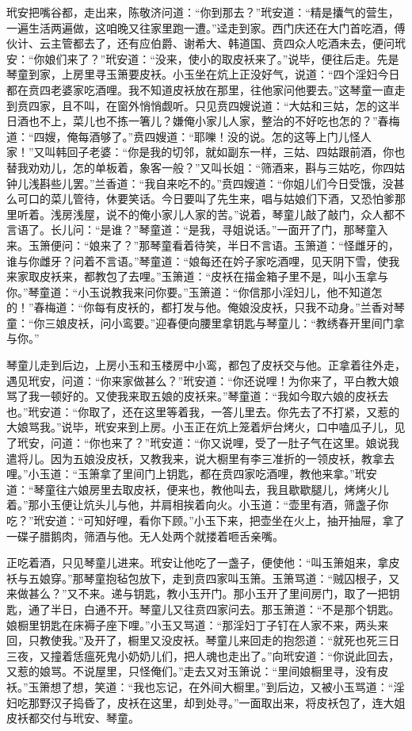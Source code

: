 玳安把嘴谷都，走出来，陈敬济问道：“你到那去？”玳安道：“精是攮气的营生，一遍生活两遍做，这咱晚又往家里跑一遭。”迳走到家。西门庆还在大门首吃酒，傅伙计、云主管都去了，还有应伯爵、谢希大、韩道国、贲四众人吃酒未去，便问玳安：“你娘们来了？”玳安道：“没来，使小的取皮袄来了。”说毕，便往后走。先是琴童到家，上房里寻玉箫要皮袄。小玉坐在炕上正没好气，说道：“四个淫妇今日都在贲四老婆家吃酒哩。我不知道皮袄放在那里，往他家问他要去。”这琴童一直走到贲四家，且不叫，在窗外悄悄觑听。只见贲四嫂说道：“大姑和三姑，怎的这半日酒也不上，菜儿也不拣一箸儿？嫌俺小家儿人家，整治的不好吃也怎的？”春梅道：“四嫂，俺每酒够了。”贲四嫂道：“耶嚛！没的说。怎的这等上门儿怪人家！”又叫韩回子老婆：“你是我的切邻，就如副东一样，三姑、四姑跟前酒，你也替我劝劝儿，怎的单板着，象客一般？”又叫长姐：“筛酒来，斟与三姑吃，你四姑钟儿浅斟些儿罢。”兰香道：“我自来吃不的。”贲四嫂道：“你姐儿们今日受饿，没甚么可口的菜儿管待，休要笑话。今日要叫了先生来，唱与姑娘们下酒，又恐怕爹那里听着。浅房浅屋，说不的俺小家儿人家的苦。”说着，琴童儿敲了敲门，众人都不言语了。长儿问：“是谁？”琴童道：“是我，寻姐说话。”一面开了门，那琴童入来。玉箫便问：“娘来了？”那琴童看着待笑，半日不言语。玉箫道：“怪雌牙的，谁与你雌牙？问着不言语。”琴童道：“娘每还在妗子家吃酒哩，见天阴下雪，使我来家取皮袄来，都教包了去哩。”玉箫道：“皮袄在描金箱子里不是，叫小玉拿与你。”琴童道：“小玉说教我来问你要。”玉箫道：“你信那小淫妇儿，他不知道怎的！”春梅道：“你每有皮袄的，都打发与他。俺娘没皮袄，只我不动身。”兰香对琴童：“你三娘皮袄，问小鸾要。”迎春便向腰里拿钥匙与琴童儿：“教绣春开里间门拿与你。”

琴童儿走到后边，上房小玉和玉楼房中小鸾，都包了皮袄交与他。正拿着往外走，遇见玳安，问道：“你来家做甚么？”玳安道：“你还说哩！为你来了，平白教大娘骂了我一顿好的。又使我来取五娘的皮袄来。”琴童道：“我如今取六娘的皮袄去也。”玳安道：“你取了，还在这里等着我，一答儿里去。你先去了不打紧，又惹的大娘骂我。”说毕，玳安来到上房。小玉正在炕上笼着炉台烤火，口中嗑瓜子儿，见了玳安，问道：“你也来了？”玳安道：“你又说哩，受了一肚子气在这里。娘说我遣将儿。因为五娘没皮袄，又教我来，说大橱里有李三准折的一领皮袄，教拿去哩。”小玉道：“玉箫拿了里间门上钥匙，都在贲四家吃酒哩，教他来拿。”玳安道：“琴童往六娘房里去取皮袄，便来也，教他叫去，我且歇歇腿儿，烤烤火儿着。”那小玉便让炕头儿与他，并肩相挨着向火。小玉道：“壶里有酒，筛盏子你吃？”玳安道：“可知好哩，看你下顾。”小玉下来，把壶坐在火上，抽开抽屉，拿了一碟子腊鹅肉，筛酒与他。无人处两个就搂着咂舌亲嘴。

正吃着酒，只见琴童儿进来。玳安让他吃了一盏子，便使他：“叫玉箫姐来，拿皮袄与五娘穿。”那琴童抱毡包放下，走到贲四家叫玉箫。玉箫骂道：“贼囚根子，又来做甚么？”又不来。递与钥匙，教小玉开门。那小玉开了里间房门，取了一把钥匙，通了半日，白通不开。琴童儿又往贲四家问去。那玉箫道：“不是那个钥匙。娘橱里钥匙在床褥子座下哩。”小玉又骂道：“那淫妇丁子钉在人家不来，两头来回，只教使我。”及开了，橱里又没皮袄。琴童儿来回走的抱怨道：“就死也死三日三夜，又撞着恁瘟死鬼小奶奶儿们，把人魂也走出了。”向玳安道：“你说此回去，又惹的娘骂。不说屋里，只怪俺们。”走去又对玉箫说：“里间娘橱里寻，没有皮袄。”玉箫想了想，笑道：“我也忘记，在外间大橱里。”到后边，又被小玉骂道：“淫妇吃那野汉子捣昏了，皮袄在这里，却到处寻。”一面取出来，将皮袄包了，连大姐皮袄都交付与玳安、琴童。


